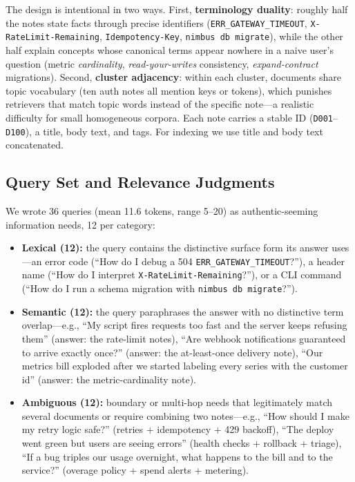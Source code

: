 \documentclass[11pt,a4paper]{article}
\newcommand{\code}[1]{\texttt{#1}}
\begin{document}
The design is intentional in two ways. First, \textbf{terminology duality}: roughly half the notes state facts through precise identifiers (\code{ERR\_GATEWAY\_TIMEOUT}, \code{X-RateLimit-Remaining}, \code{Idempotency-Key}, \code{nimbus db migrate}), while the other half explain concepts whose canonical terms appear nowhere in a naive user's question (metric \emph{cardinality}, \emph{read-your-writes} consistency, \emph{expand-contract} migrations). Second, \textbf{cluster adjacency}: within each cluster, documents share topic vocabulary (ten auth notes all mention keys or tokens), which punishes retrievers that match topic words instead of the specific note---a realistic difficulty for small homogeneous corpora. Each note carries a stable ID (\code{D001}--\code{D100}), a title, body text, and tags. For indexing we use title and body text concatenated.

\subsection{Query Set and Relevance Judgments}

We wrote 36 queries (mean 11.6 tokens, range 5--20) as authentic-seeming information needs, 12 per category:

\begin{itemize}[leftmargin=1.4em, itemsep=2pt]
    \item \textbf{Lexical (12):} the query contains the distinctive surface form its answer uses---an error code (``How do I debug a 504 \code{ERR\_GATEWAY\_TIMEOUT}?''), a header name (``How do I interpret \code{X-RateLimit-Remaining}?''), or a CLI command (``How do I run a schema migration with \code{nimbus db migrate}?'').
    \item \textbf{Semantic (12):} the query paraphrases the answer with no distinctive term overlap---e.g., ``My script fires requests too fast and the server keeps refusing them'' (answer: the rate-limit notes), ``Are webhook notifications guaranteed to arrive exactly once?'' (answer: the at-least-once delivery note), ``Our metrics bill exploded after we started labeling every series with the customer id'' (answer: the metric-cardinality note).
    \item \textbf{Ambiguous (12):} boundary or multi-hop needs that legitimately match several documents or require combining two notes---e.g., ``How should I make my retry logic safe?'' (retries + idempotency + 429 backoff), ``The deploy went green but users are seeing errors'' (health checks + rollback + triage), ``If a bug triples our usage overnight, what happens to the bill and to the service?'' (overage policy + spend alerts + metering).
\end{itemize}
\end{document}
